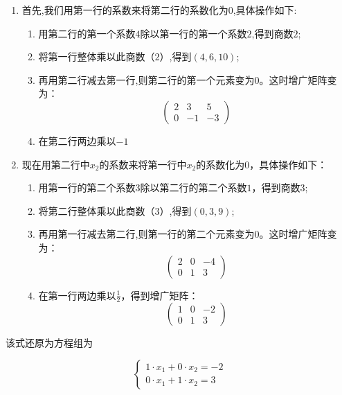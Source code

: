 \documentclass[lang=cn,newtx,10pt,scheme=chinese]{elegantbook}
\begin{document}
\begin{enumerate}
    \item 首先,我们用第一行的系数来将第二行的系数化为$0$,具体操作如下:
    \begin{enumerate}
        \item 用第二行的第一个系数$4$除以第一行的第一个系数$2$,得到商数$2$;
        \item 将第一行整体乘以此商数（$2$）,得到$(4,6,10)$;
        \item 再用第二行减去第一行,则第二行的第一个元素变为$0$。这时增广矩阵变为：
        \begin{equation}
            \left(\begin{array}{cc|c}
        2 & 3 & 5 \\
        0 & -1 & -3
        \end{array}\right)
        \label{eq:行阶梯形矩阵}
        \end{equation}
        \item 在第二行两边乘以$-1$
    \end{enumerate}
    \item 现在用第二行中$x_2$的系数来将第一行中$x_2$的系数化为$0$，具体操作如下：
    \begin{enumerate}
        \item 用第一行的第二个系数$3$除以第二行的第二个系数$1$，得到商数$3$;
        \item 将第二行整体乘以此商数（$3$）,得到$(0,3,9)$;
        \item 再用第一行减去第二行,则第一行的第二个元素变为$0$。这时增广矩阵变为：
        \[
        \left(\begin{array}{cc|c}
        2 & 0 & -4 \\
        0 & 1 & 3
        \end{array}\right)
        \]
        \item 在第一行两边乘以$\frac{1}{2}$，得到增广矩阵：
        \begin{equation}
            \left(\begin{array}{cc|c}
        1 & 0 & -2 \\
        0 & 1 & 3
        \end{array}\right)
        \label{eq:简化行阶梯形矩阵}
        \end{equation}
    \end{enumerate}
\end{enumerate}

该式还原为方程组为

\[
\left\{
\begin{array}{l}
1 \cdot x_1 + 0 \cdot x_2 = -2\\
0 \cdot x_1 + 1\cdot x_2 = 3
\end{array}
\right.
\]
\end{document}
